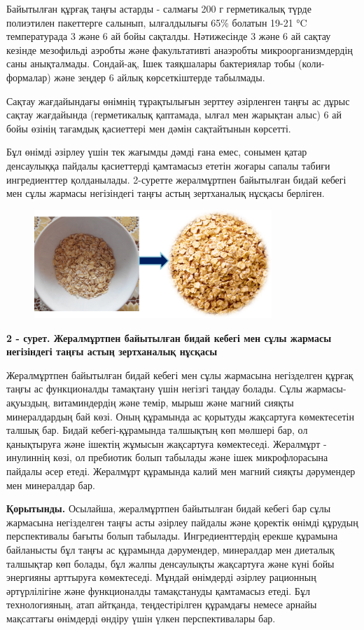 Байытылған құрғақ таңғы астарды - салмағы 200 г герметикалық түрде
полиэтилен пакеттерге салынып, ылғалдылығы 65\% болатын 19-21 °C
температурада 3 және 6 ай бойы сақталды. Нәтижесінде 3 және 6 ай сақтау
кезінде мезофильді аэробты және факультативті анаэробты
микроорганизмдердің саны анықталмады. Сондай-ақ, Ішек таяқшалары
бактериялар тобы (коли-формалар) және зеңдер 6 айлық көрсеткіштерде
табылмады.

Сақтау жағдайындағы өнімнің тұрақтылығын зерттеу әзірленген таңғы ас
дұрыс сақтау жағдайында (герметикалық қаптамада, ылғал мен жарықтан
алыс) 6 ай бойы өзінің тағамдық қасиеттері мен дәмін сақтайтынын
көрсетті.

Бұл өнімді әзірлеу үшін тек жағымды дәмді ғана емес, сонымен қатар
денсаулыққа пайдалы қасиеттерді қамтамасыз ететін жоғары сапалы табиғи
ингредиенттер қолданылады. 2-суретте жералмұртпен байытылған бидай
кебегі мен сұлы жармасы негізіндегі таңғы астың зертханалық нұсқасы
берліген.

\begin{figure}[H]
	\centering
	\includegraphics[width=0.8\textwidth]{media/pish2/image3}
	\caption*{}
\end{figure}


{\bfseries 2 - сурет. Жералмұртпен байытылған бидай кебегі мен сұлы жармасы
негізіндегі таңғы астың зертханалық нұсқасы}

Жералмұртпен байытылған бидай кебегі мен сұлы жармасына негізделген
құрғақ таңғы ас функционалды тамақтану үшін негізгі таңдау болады. Сұлы
жармасы-ақуыздың, витаминдердің және темір, мырыш және магний сияқты
минералдардың бай көзі. Оның құрамында ас қорытуды жақсартуға
көмектесетін талшық бар. Бидай кебегі-құрамында талшықтың көп мөлшері
бар, ол қанықтыруға және ішектің жұмысын жақсартуға көмектеседі.
Жералмұрт - инулиннің көзі, ол пребиотик болып табылады және ішек
микрофлорасына пайдалы әсер етеді. Жералмұрт құрамында калий мен магний
сияқты дәрумендер мен минералдар бар.

{\bfseries Қорытынды.} Осылайша, жералмұртпен байытылған бидай кебегі бар
сұлы жармасына негізделген таңғы асты әзірлеу пайдалы және қоректік
өнімді құрудың перспективалы бағыты болып табылады. Ингредиенттердің
ерекше құрамына байланысты бұл таңғы ас құрамында дәрумендер, минералдар
мен диеталық талшықтар көп болады, бұл жалпы денсаулықты жақсартуға және
күні бойы энергияны арттыруға көмектеседі. Мұндай өнімдерді әзірлеу
рационның әртүрлілігіне және функционалды тамақстануды қамтамасыз етеді.
Бұл технологияның, атап айтқанда, теңдестірілген құрамдағы немесе арнайы
мақсаттағы өнімдерді өндіру үшін үлкен перспективалары бар.

